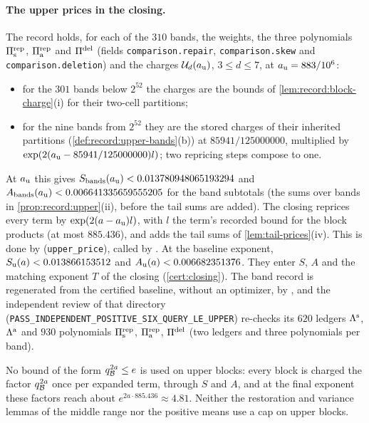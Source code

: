\paragraph{The upper prices in the closing.}
The record  holds,
for each of the $310$ bands, the weights, the three polynomials
$\Pi^{\rm rep}_{\rm s}$, $\Pi^{\rm rep}_{\rm a}$ and $\Pi^{\rm del}$ (fields
\texttt{comparison.repair}, \texttt{comparison.skew} and
\texttt{comparison.deletion}) and the charges $\mathcal U_d(a_{\rm u})$, $3\le d\le7$,
at $a_{\rm u}=883/10^6$:
\begin{itemize}
\item for the $301$ bands below $2^{52}$ the charges are the bounds of
 \cref{lem:record:block-charge}(i) for their two-cell partitions;
\item for the nine bands from $2^{52}$ they are the stored charges of their
 inherited partitions (\cref{def:record:upper-bands}(b)) at $85941/125000000$,
 multiplied by $\exp(2(a_{\rm u}-85941/125000000)l)$; two repricing steps compose to
 one.
\end{itemize}
At $a_{\rm u}$ this gives $S_{\rm bands}(a_{\rm u})<0.013780948065193294$ and
$A_{\rm bands}(a_{\rm u})<0.006641335659555205$ for the band subtotals (the sums
over bands in \cref{prop:record:upper}(ii), before the tail sums are added). The closing reprices every term by $\exp(2(a-a_{\rm u})l)$, with $l$ the
term's recorded bound for the block products (at most $885.436$), and adds the tail
sums of \cref{lem:tail-prices}(iv). This is done by
 (\texttt{upper\_price}),
called by . At the baseline
exponent, $S_{\rm u}(a)<0.013866153512$ and $A_{\rm u}(a)<0.006682351376$. They
enter $S$, $A$ and the matching exponent $T$ of the closing (\cref{cert:closing}).
The band record is regenerated from the certified baseline, without an optimizer, by
, and the independent review
 of that directory
(\texttt{PASS\_\allowbreak INDEPENDENT\_\allowbreak POSITIVE\_\allowbreak SIX\_\allowbreak QUERY\_\allowbreak LE\_\allowbreak UPPER}) re-checks its $620$ ledgers $\Lambda^{\rm s}$, $\Lambda^{\rm a}$ and $930$
polynomials $\Pi^{\rm rep}_{\rm s}$, $\Pi^{\rm rep}_{\rm a}$, $\Pi^{\rm del}$
(two ledgers and three polynomials per band).

No bound of the form $q_\mathcal B^{2a}\le e$ is used on upper blocks: every block is
charged the factor $q_\mathcal B^{2a}$ once per expanded term, through $S$
and $A$, and at the final exponent these factors reach about
$e^{2a\cdot885.436}\approx4.81$. Neither the restoration and variance lemmas of
the middle range nor the positive means use a cap on upper blocks.

